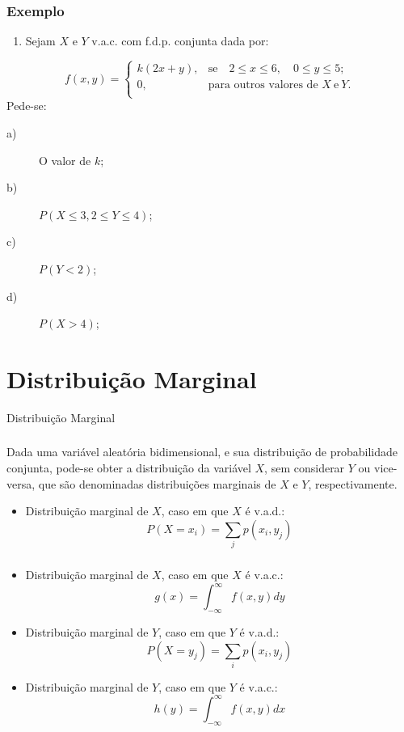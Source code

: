 \documentclass[14pt,aspectratio=1610]{beamer}
\begin{document}
\begin{frame}{}
\frametitle{Exemplo}
\begin{block}{}
\vspace{-1cm}
\begin{enumerate}
\item Sejam $X$ e $Y$ v.a.c. com f.d.p. conjunta dada por:
\end{enumerate}
$$
f(x,y)=\left\{
\begin{array}{ccc}
k(2x+y),& \textrm{se}\quad 2\leq x\leq 6,\quad 0\leq y\leq 5;\\
0,& \textrm{para outros valores de\ }X\ \textrm{e}\ Y.\\
\end{array}
\right.
$$
Pede-se:
\begin{description}
\item[a)] O valor de $k$;
\item[b)] $P(X\leq 3, 2\leq Y \leq 4)$;
\item[c)] $P(Y<2)$;
\item[d)] $P(X>4)$;
\end{description}
\end{block}
\end{frame}

\section{Distribuição Marginal}
\begin{frame}{Distribuição Marginal}
\frametitle{}
\begin{block}{}
\justifying
Dada uma variável aleatória bidimensional, e sua distribuição de probabilidade conjunta, pode-se obter a distribuição da variável $X$, sem considerar $Y$ ou vice-versa, 
que são denominadas distribuições marginais de $X$ e $Y$, respectivamente.

\begin{itemize}
\item Distribuição marginal de $X$, caso em que $X$ é v.a.d.:
$$\displaystyle P(X=x_{i})=\sum_{j}p(x_{i},y_{j})$$
\end{itemize}
\end{block}
\end{frame}

\begin{frame}{}
\frametitle{}
\begin{block}{}
\begin{itemize}
\item Distribuição marginal de $X$, caso em que $X$ é v.a.c.:
$$\displaystyle g(x)=\int_{-\infty}^{\infty} f(x,y)dy$$\pause
\vspace{-0.5cm}
\item Distribuição marginal de $Y$, caso em que $Y$ é v.a.d.:
$$\displaystyle P(X=y_{j})=\sum_{i}p(x_{i},y_{j})$$\pause
\vspace{-0.5cm}
\item Distribuição marginal de $Y$, caso em que $Y$ é v.a.c.:
$$\displaystyle h(y)=\int_{-\infty}^{\infty} f(x,y)dx$$
\end{itemize}
\end{block}
\end{frame}
\end{document}
